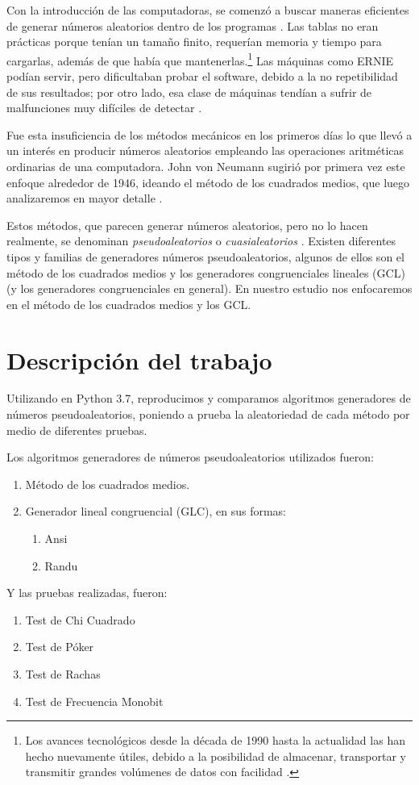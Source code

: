 Con la introducción de las computadoras, se comenzó a buscar maneras eficientes de generar números aleatorios dentro de los programas \cite{knuth1997seminumerical}. Las tablas no eran prácticas porque tenían un tamaño finito, requerían memoria y tiempo para cargarlas, además de que había que mantenerlas.\footnote{Los avances tecnológicos desde la década de 1990 hasta la actualidad las han hecho nuevamente útiles, debido a la posibilidad de almacenar, transportar y transmitir grandes volúmenes de datos con facilidad \cite{knuth1997seminumerical}.} Las máquinas como ERNIE podían servir, pero dificultaban probar el software, debido a la no repetibilidad de sus resultados; por otro lado, esa clase de máquinas tendían a sufrir de malfunciones muy difíciles de detectar \cite{knuth1997seminumerical}.

Fue esta insuficiencia de los métodos mecánicos en los primeros días lo que llevó a un interés en producir números aleatorios empleando las operaciones aritméticas ordinarias de una computadora. John von Neumann sugirió por primera vez este enfoque alrededor de 1946, ideando el método de los cuadrados medios, que luego analizaremos en mayor detalle \cite{knuth1997seminumerical}.

Estos métodos, que parecen generar números aleatorios, pero no lo hacen realmente, se denominan \emph{pseudoaleatorios} o \emph{cuasialeatorios} \cite{knuth1997seminumerical}. Existen diferentes tipos y familias de generadores números pseudoaleatorios, algunos de ellos son el método de los cuadrados medios y los generadores congruenciales lineales (GCL) (y los generadores congruenciales en general). En nuestro estudio nos enfocaremos en el método de los cuadrados medios y los GCL.

\section{Descripción del trabajo}
    Utilizando en Python 3.7, reproducimos y comparamos algoritmos generadores de números pseudoaleatorios, poniendo a prueba
    la aleatoriedad de cada método por medio de diferentes pruebas.

    Los algoritmos generadores de números pseudoaleatorios utilizados fueron:
\begin{enumerate}
    \item Método de los cuadrados medios.
    \item Generador lineal congruencial (GLC), en sus formas:
    \begin{enumerate}
        \item Ansi
        \item Randu
    \end{enumerate}
\end{enumerate}
    Y las pruebas realizadas, fueron:
\begin{enumerate}
    \item Test de Chi Cuadrado
    \item Test de Póker
    \item Test de Rachas
    \item Test de Frecuencia Monobit
\end{enumerate}


